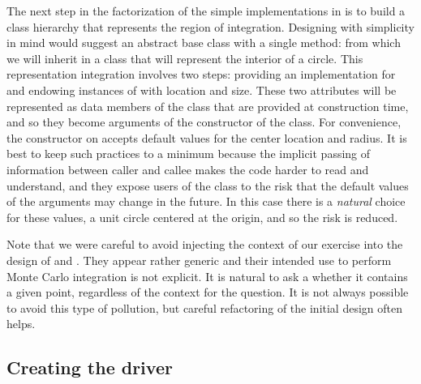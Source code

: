 The next step in the factorization of the simple implementations in  is to build
a class hierarchy that represents the region of integration. Designing with simplicity in mind
would suggest an abstract base class  with a single method:
%
%
from which we will inherit in a class  that will represent the interior of a
circle.  This representation integration involves two steps: providing an implementation for
 and endowing instances of  with location and size. These two
attributes will be represented as data members of the class that are provided at construction
time, and so they become arguments of the constructor of the class.
%
%
For convenience, the constructor on  accepts default values for
the center location and radius. It is best to keep such practices to a minimum because the
implicit passing of information between caller and callee makes the code harder to read and
understand, and they expose users of the class  to the risk that the default
values of the arguments may change in the future. In this case there is a {\em natural} choice
for these values, a unit circle centered at the origin, and so the risk is reduced.

Note that we were careful to avoid injecting the context of our exercise into the design of
 and . They appear rather generic and their intended use to perform
Monte Carlo integration is not explicit. It is natural to ask a  whether it
contains a given point, regardless of the context for the question. It is not always possible
to avoid this type of pollution, but careful refactoring of the initial design often helps. 

\subsection{Creating the driver}
\label{sec:classes:driver}

